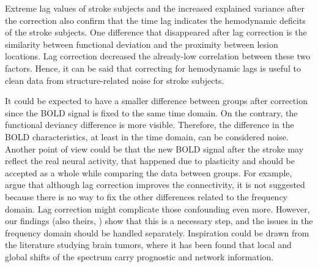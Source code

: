 \documentclass[fleqn,10pt]{wlscirep}
\begin{document}
Extreme lag values of stroke subjects and the increased explained variance after the correction also confirm that the time lag indicates the hemodynamic deficits of the stroke subjects. One difference that disappeared after lag correction is the similarity between functional deviation and the proximity between lesion locations. Lag correction decreased the already-low correlation between these two factors. Hence, it can be said that correcting for hemodynamic lags is useful to clean data from structure-related noise for stroke subjects.

It could be expected to have a smaller difference between groups after correction since the BOLD signal is fixed to the same time domain. On the contrary, the functional deviancy difference is more visible. Therefore, the difference in the BOLD characteristics, at least in the time domain, can be considered noise. Another point of view could be that the new BOLD signal after the stroke may reflect the real neural activity, that happened due to plasticity and should be accepted as a whole while comparing the data between groups. For example, \citet{siegel2016disruptions} argue that although lag correction improves the connectivity, it is not suggested because there is no way to fix the other differences related to the frequency domain. Lag correction might complicate those confounding even more. However, our findings (also theirs, \cite{siegel2016effects}) show that this is a necessary step, and the issues in the frequency domain should be handled separately. Inspiration could be drawn from the literature studying brain tumors, where it has been found that local and global shifts of the spectrum carry prognostic \citep{park2023glioblastoma} and network \citep{falco2024functional} information.

\end{document}
